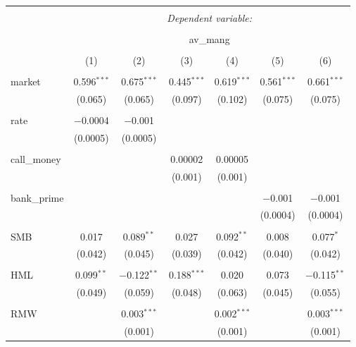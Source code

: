 
\begin{table}[!htbp] \centering 
  \caption{} 
  \label{} 
\begin{tabular}{@{\extracolsep{5pt}}lcccccc} 
\\[-1.8ex]\hline 
\hline \\[-1.8ex] 
 & \multicolumn{6}{c}{\textit{Dependent variable:}} \\ 
\cline{2-7} 
\\[-1.8ex] & \multicolumn{6}{c}{av\_mang} \\ 
\\[-1.8ex] & (1) & (2) & (3) & (4) & (5) & (6)\\ 
\hline \\[-1.8ex] 
 market & 0.596$^{***}$ & 0.675$^{***}$ & 0.445$^{***}$ & 0.619$^{***}$ & 0.561$^{***}$ & 0.661$^{***}$ \\ 
  & (0.065) & (0.065) & (0.097) & (0.102) & (0.075) & (0.075) \\ 
  & & & & & & \\ 
 rate & $-$0.0004 & $-$0.001 &  &  &  &  \\ 
  & (0.0005) & (0.0005) &  &  &  &  \\ 
  & & & & & & \\ 
 call\_money &  &  & 0.00002 & 0.00005 &  &  \\ 
  &  &  & (0.001) & (0.001) &  &  \\ 
  & & & & & & \\ 
 bank\_prime &  &  &  &  & $-$0.001 & $-$0.001 \\ 
  &  &  &  &  & (0.0004) & (0.0004) \\ 
  & & & & & & \\ 
 SMB & 0.017 & 0.089$^{**}$ & 0.027 & 0.092$^{**}$ & 0.008 & 0.077$^{*}$ \\ 
  & (0.042) & (0.045) & (0.039) & (0.042) & (0.040) & (0.042) \\ 
  & & & & & & \\ 
 HML & 0.099$^{**}$ & $-$0.122$^{**}$ & 0.188$^{***}$ & 0.020 & 0.073 & $-$0.115$^{**}$ \\ 
  & (0.049) & (0.059) & (0.048) & (0.063) & (0.045) & (0.055) \\ 
  & & & & & & \\ 
 RMW &  & 0.003$^{***}$ &  & 0.002$^{***}$ &  & 0.003$^{***}$ \\ 
  &  & (0.001) &  & (0.001) &  & (0.001) \\ 

\end{tabular}
\end{table}
